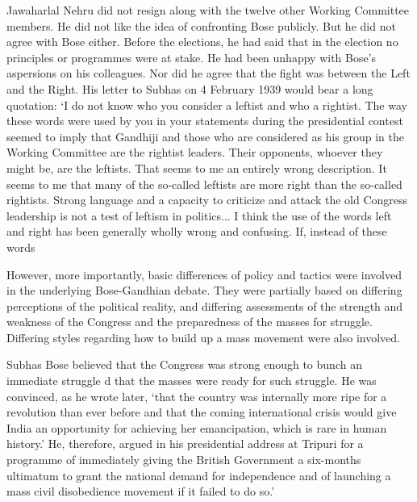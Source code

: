 Jawaharlal Nehru did not resign along with the twelve other Working Committee members. He did not like the idea of confronting Bose publicly. But he did not agree with Bose either. Before the elections, he had said that in the election no principles or programmes were at stake. He had been unhappy with Bose’s aspersions on his colleagues. Nor did he agree that the fight was between the Left and the Right. His letter to Subhas on 4 February 1939 would bear a long quotation: ‘I do not know who you consider a leftist and who a rightist. The way these words were used by you in your statements during the presidential contest seemed to imply that Gandhiji and those who are considered as his group in the Working Committee are the rightist leaders. Their opponents, whoever they might be, are the leftists. That seems to me an entirely wrong description. It seems to me that many of the so-called leftists are more right than the so-called rightists. Strong language and a capacity to criticize and attack the old Congress leadership is not a test of leftism in politics... I think the use of the words left and right has been generally wholly wrong and confusing. If, instead of these words%

However, more importantly, basic differences of policy and tactics were involved in the underlying Bose-Gandhian debate. They were partially based on differing perceptions of the political reality, and differing assessments of the strength and weakness of the Congress and the preparedness of the masses for struggle. Differing styles regarding how to build up a mass movement were also involved. 

Subhas Bose believed that the Congress was strong enough to bunch an immediate struggle d that the masses were ready for such struggle. He was convinced, as he wrote later, ‘that the country was internally more ripe for a revolution than ever before and that the coming international crisis would give India an opportunity for achieving her emancipation, which is rare in human history.’ He, therefore, argued in his presidential address at Tripuri for a programme of immediately giving the British Government a six-months ultimatum to grant the national demand for independence and of launching a mass civil disobedience movement if it failed to do so.’ 

